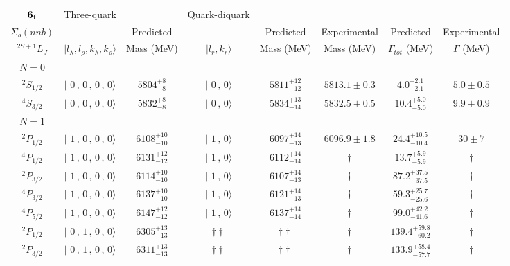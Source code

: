 \begin{tabular}{c| c c c c c c c}\hline \hline
${\bf {6}}_{\rm f}$  & Three-quark & & Quark-diquark   &             &      &        &  \\ 
$\Sigma_{b}(nnb)$ &   & Predicted  &   &  Predicted   &  Experimental &  Predicted            & Experimental \\ 
 $^{2S+1}L_{J}$ & $\vert l_{\lambda}, l_{\rho}, k_{\lambda}, k_{\rho} \rangle$ & Mass (MeV)  & $\vert l_{r}, k_{r} \rangle$  &  Mass (MeV)   &  Mass (MeV)   &  $\Gamma_{tot}$ (MeV) & $\Gamma$ (MeV) \\ \hline
\hline
 $N=0$  &  &  &  &  &  \\ 
$^{2}S_{1/2}$ & $\vert \,\,0\,,\,0\,,\,0\,,\,0 \rangle $ & $5804^{+8}_{-8}$ & $\vert \,\,0\,,\,0 \rangle$ & $5811^{+12}_{-12}$ & $5813.1\pm 0.3$ & $4.0^{+2.1}_{-2.1}$ & $5.0\pm 0.5$ \\ 
$^{4}S_{3/2}$ & $\vert \,\,0\,,\,0\,,\,0\,,\,0 \rangle $ & $5832^{+8}_{-8}$ & $\vert \,\,0\,,\,0 \rangle$ & $5834^{+13}_{-14}$ & $5832.5\pm 0.5$ & $10.4^{+5.0}_{-5.0}$ & $9.9\pm 0.9$ \\ 
\hline
 $N=1$  &  &  &  &  &  \\ 
$^{2}P_{1/2}$ & $\vert \,\,1\,,\,0\,,\,0\,,\,0 \rangle $ & $6108^{+10}_{-10}$ & $\vert \,\,1\,,\,0 \rangle$ & $6097^{+14}_{-13}$ & $6096.9\pm 1.8$ & $24.4^{+10.5}_{-10.4}$ & $30\pm 7$ \\ 
$^{4}P_{1/2}$ & $\vert \,\,1\,,\,0\,,\,0\,,\,0 \rangle $ & $6131^{+12}_{-12}$ & $\vert \,\,1\,,\,0 \rangle$ & $6112^{+14}_{-14}$ & $\dagger$ & $13.7^{+5.9}_{-5.9}$ & $\dagger$ \\ 
$^{2}P_{3/2}$ & $\vert \,\,1\,,\,0\,,\,0\,,\,0 \rangle $ & $6114^{+10}_{-10}$ & $\vert \,\,1\,,\,0 \rangle$ & $6107^{+14}_{-13}$ & $\dagger$ & $87.2^{+37.5}_{-37.5}$ & $\dagger$ \\ 
$^{4}P_{3/2}$ & $\vert \,\,1\,,\,0\,,\,0\,,\,0 \rangle $ & $6137^{+10}_{-10}$ & $\vert \,\,1\,,\,0 \rangle$ & $6121^{+14}_{-13}$ & $\dagger$ & $59.3^{+25.7}_{-25.6}$ & $\dagger$ \\ 
$^{4}P_{5/2}$ & $\vert \,\,1\,,\,0\,,\,0\,,\,0 \rangle $ & $6147^{+12}_{-12}$ & $\vert \,\,1\,,\,0 \rangle$ & $6137^{+14}_{-14}$ & $\dagger$ & $99.0^{+42.2}_{-41.6}$ & $\dagger$ \\ 
$^{2}P_{1/2}$ & $\vert \,\,0\,,\,1\,,\,0\,,\,0 \rangle $ & $6305^{+13}_{-13}$ & $\dagger\dagger$ & $\dagger\dagger$ & $\dagger$ & $139.4^{+59.8}_{-60.2}$ & $\dagger$ \\ 
$^{2}P_{3/2}$ & $\vert \,\,0\,,\,1\,,\,0\,,\,0 \rangle $ & $6311^{+13}_{-13}$ & $\dagger\dagger$ & $\dagger\dagger$ & $\dagger$ & $133.9^{+58.4}_{-57.7}$ & $\dagger$ \\ 

\end{tabular}
